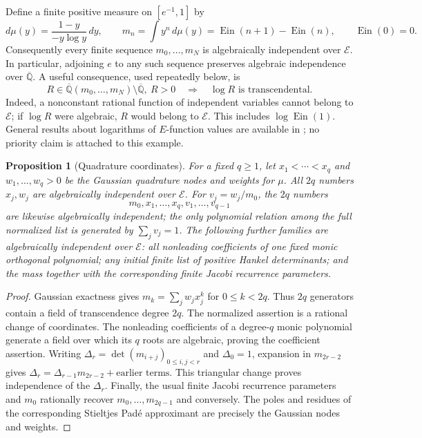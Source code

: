 \documentclass[11pt,a4paper]{article}
\newtheorem{proposition}[theorem]{Proposition}
\theoremstyle{definition}
\theoremstyle{remark}
\numberwithin{equation}{section}
\newcommand{\Qbar}{\overline{\mathbb Q}}
\DeclareMathOperator{\Ein}{Ein}
\begin{document}
Define a finite positive measure on $[e^{-1},1]$ by
\begin{equation}\label{tf-measure}
 d\mu(y)=\frac{1-y}{-y\log y}\,dy,
 \qquad m_n=\int y^n\,d\mu(y)
       =\Ein(n+1)-\Ein(n),\qquad \Ein(0)=0.
\end{equation}
Consequently every finite sequence $m_0,\ldots,m_N$ is algebraically
independent over $\mathcal E$.  In particular, adjoining $e$ to any such
sequence preserves algebraic independence over $\Qbar$.
A useful consequence, used repeatedly below, is
\begin{equation}\label{tf-log-rule}
 R\in\Qbar(m_0,\ldots,m_N)\setminus\Qbar,\ R>0
       \quad\Longrightarrow\quad \log R\text{ is transcendental}.
\end{equation}
Indeed, a nonconstant rational function of independent variables cannot
belong to $\mathcal E$; if $\log R$ were algebraic, $R$ would belong to
$\mathcal E$.  This includes $\log\Ein(1)$.  General results about
logarithms of $E$-function values are available in
\cite{tf-log-e-functions}; no priority claim is attached to this example.

\begin{proposition}[Quadrature coordinates]\label{tf-quadrature}
For a fixed $q\ge1$, let $x_1<\cdots<x_q$ and $w_1,\ldots,w_q>0$
be the Gaussian quadrature nodes and weights for $\mu$.
All $2q$ numbers $x_j,w_j$ are algebraically independent over
$\mathcal E$.  For $v_j=w_j/m_0$, the $2q$ numbers
\[
 m_0,x_1,\ldots,x_q,v_1,\ldots,v_{q-1}
\]
are likewise algebraically independent; the only polynomial relation
among the full normalized list is generated by $\sum_jv_j=1$.
The following further families are algebraically independent over
$\mathcal E$: all nonleading coefficients of one fixed monic orthogonal polynomial;
any initial finite list of positive Hankel determinants; and the mass
together with the corresponding finite Jacobi recurrence parameters.
\end{proposition}
\begin{proof}
Gaussian exactness gives $m_k=\sum_jw_jx_j^k$ for $0\le k<2q$.
Thus $2q$ generators contain a field of transcendence degree $2q$.
The normalized assertion is a rational change of coordinates.
The nonleading coefficients of a degree-$q$ monic polynomial generate a field over
which its $q$ roots are algebraic, proving the coefficient assertion.
Writing
$\Delta_r=\det(m_{i+j})_{0\le i,j<r}$ and $\Delta_0=1$, expansion in
$m_{2r-2}$ gives
$\Delta_r=\Delta_{r-1}m_{2r-2}+\text{earlier terms}$.
This triangular change proves independence of the $\Delta_r$.
Finally, the usual finite Jacobi recurrence parameters and $m_0$
rationally recover $m_0,\ldots,m_{2q-1}$ and conversely.
The poles and residues of the corresponding Stieltjes Pad\'e approximant
are precisely the Gaussian nodes and weights.
\end{proof}
\end{document}
